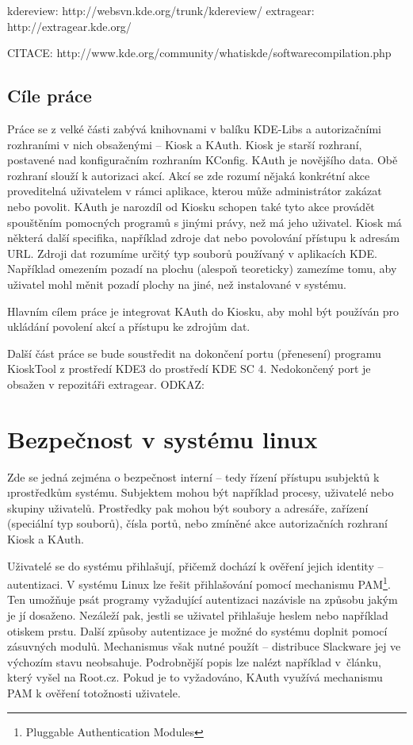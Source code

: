 kdereview: http://websvn.kde.org/trunk/kdereview/
extragear: http://extragear.kde.org/

CITACE: http://www.kde.org/community/whatiskde/softwarecompilation.php

\section{Cíle práce}
Práce se z velké části zabývá knihovnami v balíku KDE-Libs a autorizačními rozhraními v nich obsaženými -- Kiosk a KAuth. Kiosk je starší rozhraní, postavené nad konfiguračním rozhraním KConfig. KAuth je novějšího data. Obě rozhraní slouží k autorizaci akcí. Akcí se zde rozumí nějaká konkrétní akce proveditelná uživatelem v rámci aplikace, kterou může administrátor zakázat nebo povolit. KAuth je narozdíl od Kiosku schopen také tyto akce provádět spouštěním pomocných programů s jinými právy, než má jeho uživatel. Kiosk má některá další specifika, například zdroje dat nebo povolování přístupu k adresám URL. Zdroji dat rozumíme určitý typ souborů používaný v aplikacích KDE. Například omezením pozadí na plochu (alespoň teoreticky) zamezíme tomu, aby uživatel mohl měnit pozadí plochy na jiné, než instalované v systému.

Hlavním cílem práce je integrovat KAuth do Kiosku, aby mohl být používán pro ukládání povolení akcí a přístupu ke zdrojům dat.

Další část práce se bude soustředit na dokončení portu (přenesení) programu KioskTool z prostředí KDE3 do prostředí KDE SC 4. Nedokončený port je obsažen v repozitáři extragear.
ODKAZ: 

\chapter{Bezpečnost v systému linux}
Zde se jedná zejména o bezpečnost interní -- tedy řízení přístupu \i{subjektů} k \i{prostředkům} systému. Subjektem mohou být například procesy, uživatelé nebo skupiny uživatelů. Prostředky pak mohou být soubory a adresáře, zařízení (speciální typ souborů), čísla portů, nebo zmíněné akce autorizačních rozhraní Kiosk a KAuth.

Uživatelé se do systému přihlašují, přičemž dochází k ověření jejich identity -- autentizaci. V systému Linux lze řešit přihlašování pomocí mechanismu PAM\footnote{Pluggable Authentication Modules}. Ten umožňuje psát programy vyžadující autentizaci nazávisle na způsobu jakým je jí dosaženo. Nezáleží pak, jestli se uživatel přihlašuje heslem nebo například otiskem prstu. Další způsoby autentizace je možné do systému doplnit pomocí zásuvných modulů. Mechanismus však nutné použít -- distribuce Slackware jej ve výchozím stavu neobsahuje. Podrobnější popis lze nalézt například v~článku, který vyšel na Root.cz\cite{rootpam}. Pokud je to vyžadováno, KAuth využívá mechanismu PAM k ověření totožnosti uživatele.

